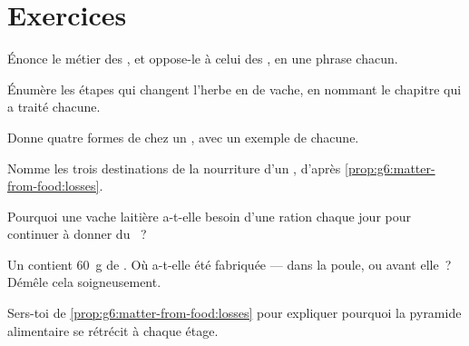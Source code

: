 \section{Exercices}

\begin{exercise}[$\star$]\label{exo:g6:matter-from-food:1}
Énonce le métier des , et oppose-le à celui des
, en une phrase chacun.
\end{exercise}

\begin{exercise}[$\star$]\label{exo:g6:matter-from-food:2}
Énumère les étapes qui changent l'herbe en  de vache, en
nommant le chapitre qui a traité chacune.
\end{exercise}

\begin{exercise}[$\star$]\label{exo:g6:matter-from-food:3}
Donne quatre formes de  chez un , avec un
exemple de chacune.
\end{exercise}

\begin{exercise}[$\star$]\label{exo:g6:matter-from-food:4}
Nomme les trois destinations de la nourriture d'un ,
d'après \cref{prop:g6:matter-from-food:losses}.
\end{exercise}

\begin{exercise}[$\star$]\label{exo:g6:matter-from-food:5}
Pourquoi une vache laitière a-t-elle besoin d'une ration chaque jour
pour continuer à donner du ~?
\end{exercise}

\begin{exercise}[$\star$]\label{exo:g6:matter-from-food:6}
Un  contient \qty{60}{g} de . Où a-t-elle été
fabriquée --- dans la poule, ou avant elle~? Démêle cela
soigneusement.
\end{exercise}

\begin{exercise}[$\star\star$]\label{exo:g6:matter-from-food:7}
Sers-toi de \cref{prop:g6:matter-from-food:losses} pour expliquer
pourquoi la pyramide alimentaire se rétrécit à chaque étage.
\end{exercise}

